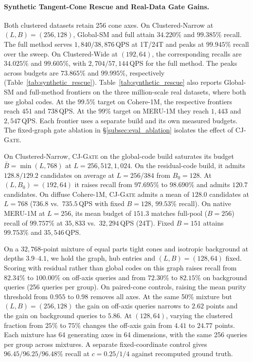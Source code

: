\paragraph{Synthetic Tangent-Cone Rescue and Real-Data Gate Gains.}
Both clustered datasets retain 256 cone axes. On {Clustered-Narrow} at $(L,B)=(256,128)$, {Global-SM} and full \rquiver{} attain $34.220\%$ and $99.385\%$ recall. The full method serves $1{,}840/38{,}876$\,QPS at 1T/24T and peaks at $99.945\%$ recall over the sweep. On {Clustered-Wide} at $(192,64)$, the corresponding recalls are $34.025\%$ and $99.605\%$, with $2{,}704/57{,}144$\,QPS for the full method. The peaks across budgets are $73.865\%$ and $99.995\%$, respectively (Table~\ref{tab:synthetic_rescue}).
Table~\ref{tab:synthetic_rescue} also reports {Global-SM} and full-method frontiers on the three million-scale real datasets, where both use global codes. At the $99.5\%$ target on {Cohere-1M}, the respective frontiers reach $451$ and $738$\,QPS. At the $99\%$ target on {MERU-1M} they reach $1{,}443$ and $2{,}547$\,QPS. Each frontier uses a separate build and its own measured budgets. The fixed-graph gate ablation in \S\ref{subsec:eval_ablation} isolates the effect of \textsc{CJ-Gate}.

On {Clustered-Narrow}, \textsc{CJ-Gate} on the global-code build saturates its budget $\bar B=\min(L,768)$ at $L=256,512,1{,}024$. On the residual-code build, it admits $128.8/129.2$ candidates on average at $L=256/384$ from $B_0=128$. At $(L,B_0)=(192,64)$ it raises recall from $97.695\%$ to $98.690\%$ and admits $120.7$ candidates.
On diffuse {Cohere-1M}, \textsc{CJ-Gate} admits a mean of $128.0$ candidates at $L=768$ ($736.8$ vs.\ $735.5$\,QPS with fixed $B=128$, $99.53\%$ recall). On native {MERU-1M} at $L=256$, its mean budget of $151.3$ matches full-pool ($B=256$) recall of $99.757\%$ at $35{,}833$ vs.\ $32{,}294$\,QPS (24T). Fixed $B=151$ attains $99.753\%$ and $35{,}546$\,QPS.

On a $32{,}768$-point mixture of equal parts tight cones and isotropic background at depths $3.9$--$4.1$, we hold the graph, hub entries and $(L,B)=(128,64)$ fixed. Scoring with residual rather than global codes on this graph raises recall from $82.34\%$ to $100.00\%$ on off-axis queries and from $72.30\%$ to $82.15\%$ on background queries (256 queries per group). On paired-cone controls, raising the mean purity threshold from $0.955$ to $0.98$ removes all axes. At the same 50\% mixture but $(L,B)=(256,128)$ the gain on off-axis queries narrows to $2.62$ points and the gain on background queries to $5.86$. At $(128,64)$, varying the clustered fraction from $25\%$ to $75\%$ changes the off-axis gain from $4.41$ to $24.77$ points. Each mixture has 64 generating axes in 64 dimensions, with the same 256 queries per group across mixtures. A separate fixed-coordinate control gives $96.45/96.25/96.48\%$ recall at $c=0.25/1/4$ against recomputed ground truth.

